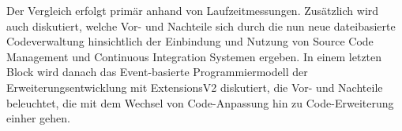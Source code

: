 Der Vergleich erfolgt primär anhand von Laufzeitmessungen. Zusätzlich wird auch diskutiert, welche Vor- und Nachteile sich durch die nun neue dateibasierte Codeverwaltung hinsichtlich der Einbindung und Nutzung von Source Code Management und Continuous Integration Systemen ergeben. In einem letzten Block wird danach das Event-basierte Programmiermodell der Erweiterungsentwicklung mit ExtensionsV2 diskutiert, die Vor- und Nachteile beleuchtet, die mit dem Wechsel von Code-Anpassung hin zu Code-Erweiterung einher gehen.

